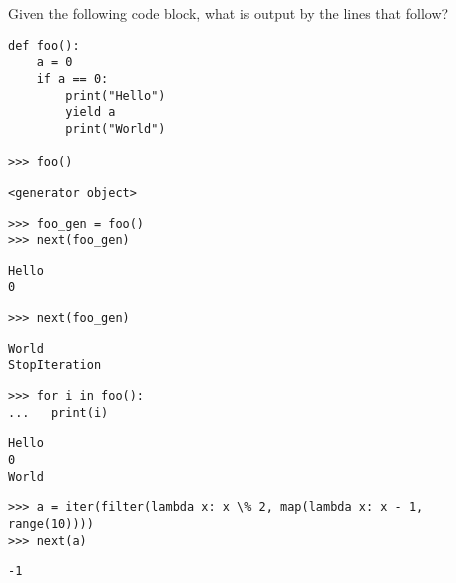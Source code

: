 \begin{blocksection}
\question Given the following code block, what is output by the lines that follow?

\begin{lstlisting}
def foo():
    a = 0
    if a == 0:
        print("Hello")
        yield a
        print("World")

>>> foo()
\end{lstlisting}
\begin{solution}[0.25in]
\begin{lstlisting}
<generator object>
\end{lstlisting}
\end{solution}
\end{blocksection}

\begin{blocksection}
\begin{lstlisting}
>>> foo_gen = foo()
>>> next(foo_gen)
\end{lstlisting}

\begin{solution}[0.5in]
\begin{lstlisting}
Hello
0
\end{lstlisting}
\end{solution}
\end{blocksection}

\begin{blocksection}
\begin{lstlisting}
>>> next(foo_gen)
\end{lstlisting}

\begin{solution}[0.5in]
\begin{lstlisting}
World
StopIteration
\end{lstlisting}
\end{solution}
\end{blocksection}

\begin{blocksection}
\begin{lstlisting}
>>> for i in foo():
...   print(i)
\end{lstlisting}

\begin{solution}[0.5in]
\begin{lstlisting}
Hello
0
World
\end{lstlisting}
\end{solution}
\end{blocksection}

\begin{blocksection}

\begin{lstlisting}
>>> a = iter(filter(lambda x: x \% 2, map(lambda x: x - 1, range(10))))
>>> next(a)
\end{lstlisting}

\begin{solution}[0.25in]
    \begin{lstlisting}
-1
    \end{lstlisting}
    \end{solution}
\end{blocksection}


